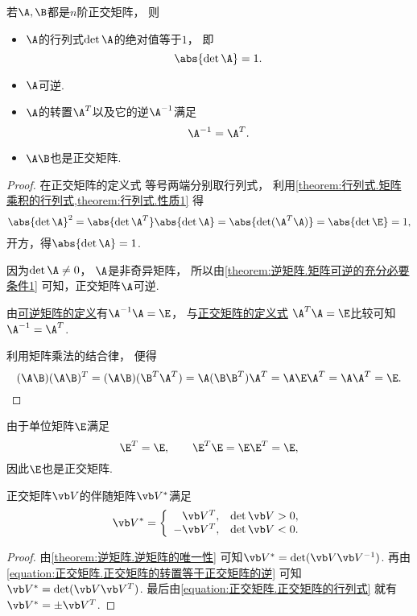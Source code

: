 \begin{property}
若\(\A,\B\)都是\(n\)阶正交矩阵，
则\begin{itemize}
	\item \(\A\)的行列式\(\det\A\)的绝对值等于\(1\)，
	即\begin{equation}\label{equation:正交矩阵.正交矩阵的行列式}
		\abs{\det\A}=1.
	\end{equation}

	\item \(\A\)可逆.

	\item \(\A\)的转置\(\A^T\)以及它的逆\(\A^{-1}\)满足
	\begin{equation}\label{equation:正交矩阵.正交矩阵的转置等于正交矩阵的逆}
		\A^{-1}=\A^T.
	\end{equation}

	\item \(\A\B\)也是正交矩阵.
\end{itemize}
\begin{proof}
在正交矩阵的定义式  等号两端分别取行列式，
利用\cref{theorem:行列式.矩阵乘积的行列式,theorem:行列式.性质1} 得\[
	\abs{\det\A}^2
	=\abs{\det\A^T} \abs{\det\A\vphantom{^T}}
	=\abs{\det(\A^T \A)}
	=\abs{\det\E}
	=1,
\]
开方，得\(\abs{\det\A}=1\).

因为\(\det\A\neq0\)，
\(\A\)是非奇异矩阵，
所以由\cref{theorem:逆矩阵.矩阵可逆的充分必要条件1} 可知，正交矩阵\(\A\)可逆.

由\hyperref[definition:可逆矩阵.可逆矩阵的定义]{可逆矩阵的定义}有\(\A^{-1}\A=\E\)，
与\hyperref[equation:正交矩阵.正交矩阵的定义式]{正交矩阵的定义式}
\(\A^T\A=\E\)比较可知\(\A^{-1}=\A^T\).

利用矩阵乘法的结合律，
便得\[
	(\A\B)(\A\B)^T
	= (\A\B)(\B^T\A^T)
	= \A(\B\B^T)\A^T
	= \A\E\A^T
	= \A\A^T
	= \E.
	\qedhere
\]
\end{proof}
\end{property}

\begin{example}
由于单位矩阵\(\E\)满足\[
	\E^T=\E, \qquad
	\E^T \E = \E \E^T = \E,
\]
因此\(\E\)也是正交矩阵.
\end{example}

\begin{proposition}
正交矩阵\(\Q\)的伴随矩阵\(\Q^*\)满足\[
	\Q^*
	= \left\{ \begin{array}{rc}
		\Q^T, & \det\Q>0, \\
		-\Q^T, & \det\Q<0.
	\end{array} \right.
\]
\begin{proof}
由\cref{theorem:逆矩阵.逆矩阵的唯一性}
可知\(\Q^* = \det(\Q \Q^{-1})\).
再由\cref{equation:正交矩阵.正交矩阵的转置等于正交矩阵的逆}
可知\(\Q^* = \det(\Q \Q^T)\).
最后由\cref{equation:正交矩阵.正交矩阵的行列式}
就有\(\Q^* = \pm\Q^T\).
\end{proof}
\end{proposition}

